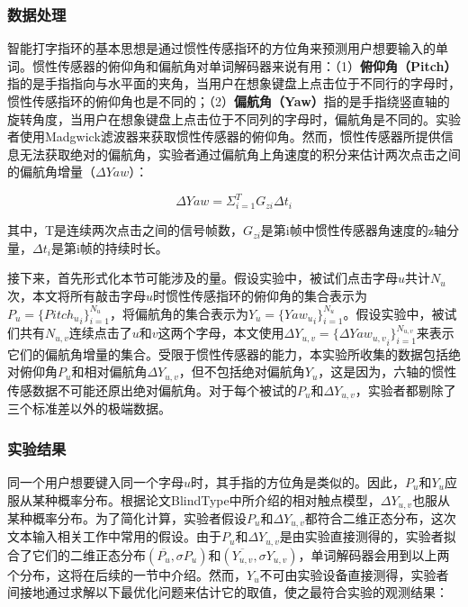 \subsubsection{数据处理}

智能打字指环的基本思想是通过惯性传感指环的方位角来预测用户想要输入的单词。惯性传感器的俯仰角和偏航角对单词解码器来说有用：（1）\textbf{俯仰角（Pitch）}指的是手指指向与水平面的夹角，当用户在想象键盘上点击位于不同行的字母时，惯性传感指环的俯仰角也是不同的；（2）\textbf{偏航角（Yaw）}指的是手指绕竖直轴的旋转角度，当用户在想象键盘上点击位于不同列的字母时，偏航角是不同的。实验者使用Madgwick滤波器\cite{madgwick2010efficient}来获取惯性传感器的俯仰角。然而，惯性传感器所提供信息无法获取绝对的偏航角，实验者通过偏航角上角速度的积分来估计两次点击之间的偏航角增量（$\Delta{Yaw}$）：

\begin{equation}
	\Delta{Yaw} = \Sigma^{T}_{i=1}G_{zi}\Delta{t_i}
\end{equation}

其中，T是连续两次点击之间的信号帧数，$G_{zi}$是第i帧中惯性传感器角速度的z轴分量，$\Delta{t_i}$是第i帧的持续时长。

接下来，首先形式化本节可能涉及的量。假设实验中，被试们点击字母$u$共计$N_u$次，本文将所有敲击字母$u$时惯性传感指环的俯仰角的集合表示为$P_u=\{{Pitch_u}_i\}^{N_u}_{i=1}$，将偏航角的集合表示为$Y_u=\{{Yaw_u}_i\}^{N_u}_{i=1}$。假设实验中，被试们共有$N_{u,v}$连续点击了$u$和$v$这两个字母，本文使用$\Delta{Y}_{u,v}=\{{\Delta{Yaw_{u ,v}}_i}\}^{N_{u,v}}_{i=1}$来表示它们的偏航角增量的集合。受限于惯性传感器的能力，本实验所收集的数据包括绝对俯仰角$P_u$和相对偏航角$\Delta{Y}_{u,v}$，但不包括绝对偏航角$Y_u$，这是因为，六轴的惯性传感数据不可能还原出绝对偏航角。对于每个被试的$P_u$和$\Delta{Y}_{u,v}$，实验者都剔除了三个标准差以外的极端数据。
 
\subsubsection{实验结果}

同一个用户想要键入同一个字母$u$时，其手指的方位角是类似的。因此，$P_u$和$Y_u$应服从某种概率分布。根据论文BlindType\cite{lu2017blindtype}中所介绍的相对触点模型，$\Delta{Y}_{u,v}$也服从某种概率分布。为了简化计算，实验者假设$P_u$和$\Delta{Y}_{u,v}$都符合二维正态分布，这次文本输入相关工作中常用的假设\cite{lu2017blindtype, yu2017tap}。由于$P_u$和$\Delta{Y}_{u,v}$是由实验直接测得的，实验者拟合了它们的二维正态分布$(\overline{P_u},\sigma{P_u})$和$(\overline{Y_{u,v}},\sigma{Y_{u,v}})$，单词解码器会用到以上两个分布，这将在后续的一节中介绍。然而，$Y_u$不可由实验设备直接测得，实验者间接地通过求解以下最优化问题来估计它的取值，使之最符合实验的观测结果：

